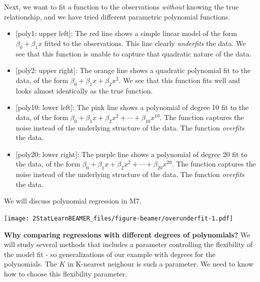 \documentclass[ignorenonframetext,]{beamer}
\providecommand{\tightlist}{%
  \setlength{\itemsep}{0pt}\setlength{\parskip}{0pt}}
\begin{document}
\begin{frame}

Next, we want to fit a function to the observations \emph{without}
knowing the true relationship, and we have tried different parametric
polynomial functions.

\begin{itemize}
\tightlist
\item
  {{[}poly1: upper left{]}}: The {red} line shows a simple linear model
  of the form \(\beta_0+\beta_1 x\) fitted to the observations. This
  line clearly \emph{underfits} the data. We see that this function is
  unable to capture that quadratic nature of the data.
\item
  {{[}poly2: upper right{]}}: The {orange} line shows a quadratic
  polynomial fit to the data, of the form
  \(\beta_0+\beta_1 x +\beta_2 x^2\). We see that this function fits
  well and looks almost identically as the true function.
\item
  {{[}poly10: lower left{]}}: The {pink} line shows a polynomial of
  degree 10 fit to the data, of the form
  \(\beta_0+\beta_1 x +\beta_2 x^2+\cdots +\beta_{10}x^{10}\). The
  function captures the noise instead of the underlying structure of the
  data. The function \emph{overfits} the data.
\item
  {{[}poly20: lower right{]}}: The {purple} line shows a polynomial of
  degree 20 fit to the data, of the form
  \(\beta_0+\beta_1 x +\beta_2 x^2+\cdots +\beta_{20}x^{20}\). The
  function captures the noise instead of the underlying structure of the
  data. The function \emph{overfits} the data.
\end{itemize}

We will discuss polynomial regression in M7.

\end{frame}

\begin{frame}

\texttt{[image: 2StatLearnBEAMER\_files/figure-beamer/overunderfit-1.pdf]}

\end{frame}

\begin{frame}

\textbf{Why comparing regressions with different degrees of
polynomials?} We will study several methods that includes a parameter
controlling the flexibility of the model fit - so generalizations of our
example with degrees for the polynomials. The \(K\) in K-nearest
neighour is such a parameter. We need to know how to choose this
flexibility parameter.

\end{frame}
\end{document}
